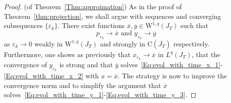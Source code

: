 \documentclass[12pt]{article}
\newcommand{\be}{\begin{equation}}
\newcommand{\ee}{\end{equation}}
\def\ra{\rightarrow}
\begin{document}
\begin{proof}(of Theorem~\ref{Thm:approimation})
As in the proof of Theorem~\ref{thm:projection}, we shall argue with 
sequences and converging subsequences $\{\varepsilon_k\}$. There exist 
functions $\overline{x},\overline{y}\in \mathrm{W}^{1,q}(J_T)$ such that
\be
p_{\varepsilon_k} \rightarrow \overline{x} \text{ and } y_{\varepsilon_k} 
\rightarrow \overline{y}
\ee
as $\varepsilon_k \rightarrow 0$ weakly in $\mathrm{W}^{1,q}(J_T)$ and 
strongly in $\mathrm{C}(\overline{J_T})$ respectively. Furthermore, one 
shows as previously that $x_{\varepsilon_k}\ra \overline{x}$ in $L^q(J_T)$,
that the convergence of $y_{\varepsilon_k}$ is strong and that $\overline{y}$ 
solves~\eqref{Eq:evol_with_time_x_1}-\eqref{Eq:evol_with_time_x_2} 
with $x=\overline{x}$. The strategy is now to improve the convergence
norm and to simplify the argument that $\overline{x}$ 
solves~\eqref{Eq:evol_with_time_y_1}-\eqref{Eq:evol_with_time_y_3}.


\end{proof}
\end{document}
